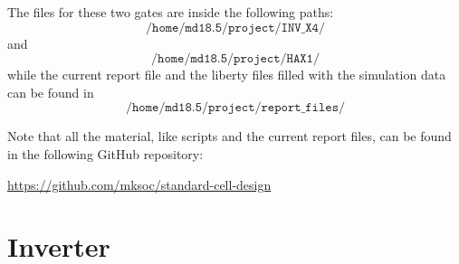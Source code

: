 \documentclass[a4paper]{article}
\begin{document}
The files for these two gates are inside the following paths:
\begin{equation*}
	\texttt{/home/md18.5/project/INV\_X4/}
\end{equation*}
and
\begin{equation*}
	\texttt{/home/md18.5/project/HAX1/}
\end{equation*}
while the current report file and the liberty files filled with the simulation data can be found in
\begin{equation*}
	\texttt{/home/md18.5/project/report\_files/}
\end{equation*}

Note that all the material, like scripts and the current report files, can be found in the following GitHub repository:
\begin{center}
	\url{https://github.com/mksoc/standard-cell-design}
\end{center}

\section{Inverter}
\end{document}
